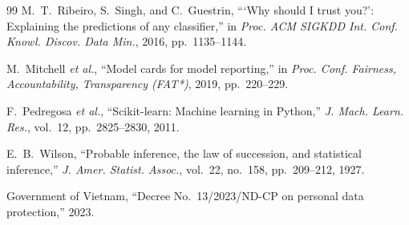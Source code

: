 \documentclass[conference]{IEEEtran}
\begin{document}
\begin{thebibliography}{99}
M.~T.~Ribeiro, S.~Singh, and C.~Guestrin, ```Why should I trust you?':
Explaining the predictions of any classifier,'' in \emph{Proc. ACM SIGKDD Int.
Conf. Knowl. Discov. Data Min.}, 2016, pp.~1135--1144.

M.~Mitchell \emph{et al.}, ``Model cards for model reporting,'' in \emph{Proc.
Conf. Fairness, Accountability, Transparency (FAT*)}, 2019, pp.~220--229.

F.~Pedregosa \emph{et al.}, ``Scikit-learn: Machine learning in Python,''
\emph{J. Mach. Learn. Res.}, vol.~12, pp.~2825--2830, 2011.

E.~B.~Wilson, ``Probable inference, the law of succession, and statistical
inference,'' \emph{J. Amer. Statist. Assoc.}, vol.~22, no.~158, pp.~209--212,
1927.

Government of Vietnam, ``Decree No.~13/2023/ND-CP on personal data protection,''
2023.

\end{thebibliography}
\end{document}
